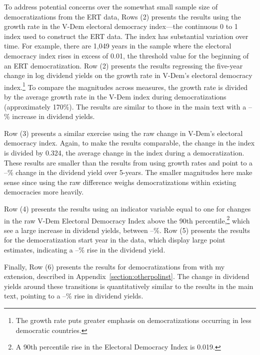 To address potential concerns over the somewhat small sample size of democratizations from the ERT data, Rows (2) presents the results using the growth rate in the V-Dem electoral democracy index---the continuous 0 to 1 index used to construct the ERT data. The index has substantial variation over time. For example, there are 1,049 years in the sample where the electoral democracy index rises in excess of 0.01, the threshold value for the beginning of an ERT democratization.  Row (2) presents the results regressing the five-year change in log dividend yields on the growth rate in V-Dem's electoral democracy index.\footnote{The growth rate puts greater emphasis on democratizations occurring in less democratic countries.} To compare the magnitudes across measures, the growth rate is divided by the average growth rate in the V-Dem index during democratizations (approximately 170\%).  The results are similar to those in the main text with a \tabBThreeIndexGrowthLow\---\tabBThreeIndexGrowthHigh\% increase in dividend yields.  

 

Row (3) presents a similar exercise using the raw change in V-Dem's electoral democracy index. Again, to make the results comparable, the change in the index is divided by 0.324, the average change in the index during a democratization. These results are smaller than the results from using growth rates and point to a \tabBThreeIndexDiffLow\---\tabBThreeIndexDiffHigh\% change in the dividend yield over 5-years. The smaller magnitudes here make sense since using the raw difference weighs democratizations within existing democracies more heavily.  

Row (4) presents the results using an indicator variable equal to one for changes in the raw V-Dem Electoral Democracy Index above the 90th percentile,\footnote{A 90th percentile rise in the Electoral Democracy Index is 0.019.} which see a large increase in dividend yields, between \tabBThreeLargeJumpLow\---\tabBThreeLargeJumpHigh\%. Row (5) presents the results for the democratization start year in the \cite{Lindberg2018} data, which display large point estimates, indicating a \tabBThreeLindbergLow\---\tabBThreeLindbergHigh\% rise in the dividend yield. 

Finally, Row (6) presents the results for democratizations from \cite{Acemoglu2019} with my extension, described in Appendix~\ref{section:otherpolinst}. The change in dividend yields around these transitions is quantitatively similar to the results in the main text, pointing to a \tabBThreeAcemogluLow\---\tabBThreeAcemogluHigh\% rise in dividend yields. 

